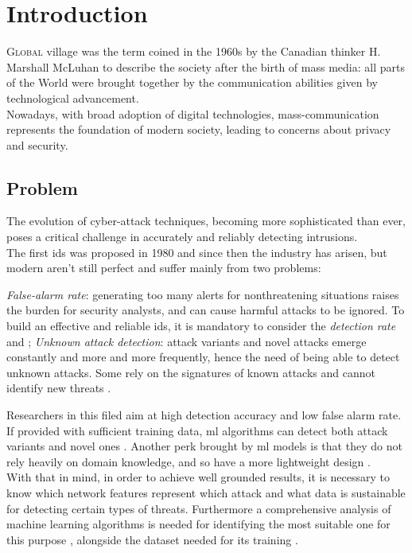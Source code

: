 \chapter{Introduction}
\label{chap:intro}

\lettrine[lines=3, findent=3pt, nindent=0pt]{G}{lobal} village was the term coined in the 1960s by the Canadian thinker H. Marshall McLuhan \cite{mcluhan1962} to describe the society after the birth of mass media: all parts of the World were brought together by the communication abilities given by technological advancement. \\
Nowadays, with broad adoption of digital technologies, mass-communication represents the foundation of modern society, leading to concerns about privacy and security.




\section{Problem}
\label{sec:problem}

The evolution of cyber-attack techniques, becoming more sophisticated than ever, poses a critical challenge in accurately and reliably detecting intrusions.\\ The first \gls{ids} was proposed in 1980 \cite{Andreson1980} and since then the industry has arisen, but modern  aren't still perfect and suffer mainly from two problems:
\begin{itemize}
    \itemAR \textit{False-alarm rate}: generating too many alerts for nonthreatening situations raises the burden for security analysts, and can cause harmful attacks to be ignored. To build an effective and reliable \gls{ids}, it is mandatory to consider the \textit{detection rate} \cite{Axelsson2000} and \cite{Liu2019};
    \itemAR \textit{Unknown attack detection}: attack variants and novel attacks emerge constantly and more and more frequently, hence the need of being able to detect unknown attacks. Some  rely on the signatures of known attacks and cannot identify new threats \cite{Hodo2017}.
\end{itemize}
Researchers in this filed aim at high detection accuracy and low false alarm rate. \\
If provided with sufficient training data, \gls{ml} algorithms can detect both attack variants and novel ones \cite{Hodo2017}. Another perk brought by \gls{ml} models is that they do not rely heavily on domain knowledge, and so have a more lightweight design \cite{Khraisat2019}. \\ With that in mind, in order to achieve well grounded results, it is necessary to know which network features represent which attack \cite{Iglesias2015} and what data is sustainable for detecting certain types of threats. Furthermore a comprehensive analysis of machine learning algorithms is needed for identifying the most suitable one for this purpose \cite{Liu2019}, alongside the dataset needed for its training \cite{Sharafaldin2019}.


